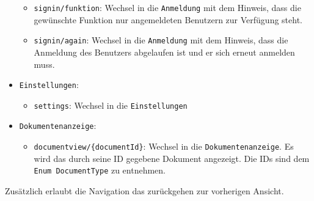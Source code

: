 \begin{itemize}
\begin{itemize}
        \item \texttt{signin/funktion}: Wechsel in die \texttt{Anmeldung} mit dem Hinweis, dass die gewünschte Funktion nur angemeldeten Benutzern zur Verfügung steht.
        \item \texttt{signin/again}: Wechsel in die \texttt{Anmeldung} mit dem Hinweis, dass die Anmeldung des Benutzers abgelaufen ist und er sich erneut anmelden muss.
    \end{itemize}
    \item \texttt{Einstellungen}: 
    \begin{itemize}
        \item \texttt{settings}: Wechsel in die \texttt{Einstellungen}
    \end{itemize}
    \item \texttt{Dokumentenanzeige}: 
    \begin{itemize}
        \item \texttt{documentview/\{documentId\}}: Wechsel in die \texttt{Dokumentenanzeige}. 
        Es wird das durch seine ID gegebene Dokument angezeigt. Die IDs sind dem \texttt{Enum DocumentType} zu entnehmen.
    \end{itemize}
\end{itemize}
Zusätzlich erlaubt die Navigation das zurückgehen zur vorherigen Ansicht.


